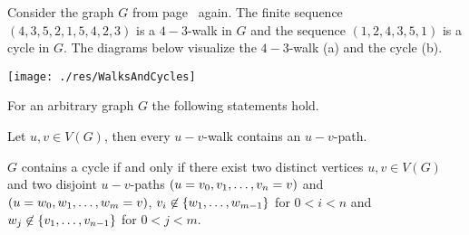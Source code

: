 \begin{exam}
Consider the graph $G$ from page~\pageref{ex:Graph} again. The finite sequence $(4, 3, 5, 2, 1, 5, 4, 2, 3)$ is a $4-3$-walk in $G$ and the sequence $(1,2,4,3,5,1)$ is a cycle in $G$. The diagrams below visualize the $4-3$-walk (a) and the cycle (b).

\begin{center}
\texttt{[image: ./res/WalksAndCycles]}
%     
%     
%     
\end{center}
\end{exam}
\begin{lem} For an arbitrary graph $G$ the following statements hold. \label{thm:Unique Paths}
\begin{thmlist}
\item Let $u,v\in V(G)$, then every $u-v$-walk contains an $u-v$-path.\label{thm:Every walk contains a trail}
\item $G$ contains a cycle if and only if there exist two distinct vertices $u,v\in V(G)$ and two disjoint $u-v$-paths $(u=v_0,\seq{v}=v)$ and $(u=w_0,\seq[m]{w}=v)$, \ie{} $v_i\not\in\lbrace\seq[m-1]{w}\rbrace$ for $0<i<n$ and $w_j\not\in\lbrace\seq[n-1]{v}\rbrace$ for $0<j<m$.
\end{thmlist}
\end{lem}
